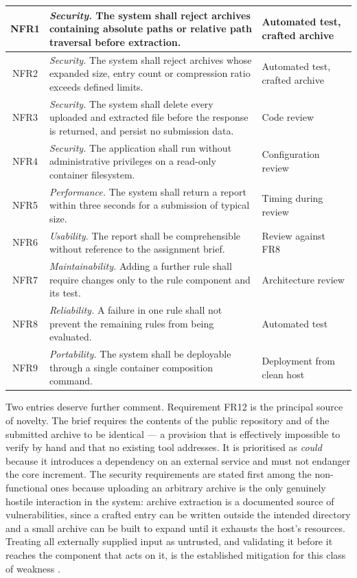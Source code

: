 \documentclass[a4paper,11pt]{article}
\begin{document}
\begin{table}[H]
\begin{tabularx}{\textwidth}{|c|X|p{2.9cm}|}
\hline
NFR1 & \textit{Security.} The system shall reject archives containing absolute paths or relative path traversal before extraction. & Automated test, crafted archive \\
\hline
NFR2 & \textit{Security.} The system shall reject archives whose expanded size, entry count or compression ratio exceeds defined limits. & Automated test, crafted archive \\
\hline
NFR3 & \textit{Security.} The system shall delete every uploaded and extracted file before the response is returned, and persist no submission data. & Code review \\
\hline
NFR4 & \textit{Security.} The application shall run without administrative privileges on a read-only container filesystem. & Configuration review \\
\hline
NFR5 & \textit{Performance.} The system shall return a report within three seconds for a submission of typical size. & Timing during review \\
\hline
NFR6 & \textit{Usability.} The report shall be comprehensible without reference to the assignment brief. & Review against FR8 \\
\hline
NFR7 & \textit{Maintainability.} Adding a further rule shall require changes only to the rule component and its test. & Architecture review \\
\hline
NFR8 & \textit{Reliability.} A failure in one rule shall not prevent the remaining rules from being evaluated. & Automated test \\
\hline
NFR9 & \textit{Portability.} The system shall be deployable through a single container composition command. & Deployment from clean host \\
\hline
\end{tabularx}
\end{table}

Two entries deserve further comment. Requirement FR12 is the principal source of
novelty. The brief requires the
contents of the public repository and of the submitted archive to be identical
--- a provision that is effectively impossible to verify by hand and that no
existing tool addresses. It is prioritised as \textit{could} because it
introduces a dependency on an external service and must not endanger the core
increment. The security requirements are stated first among the non-functional
ones because uploading an arbitrary archive is the only genuinely hostile
interaction in the system: archive extraction is a documented source of
vulnerabilities, since a crafted entry can be written outside the intended
directory and a small archive can be built to expand until it exhausts the
host's resources. Treating all externally supplied input as untrusted, and
validating it before it reaches the component that acts on it, is the
established mitigation for this class of weakness \citep{OWASP2021}.
\end{document}
